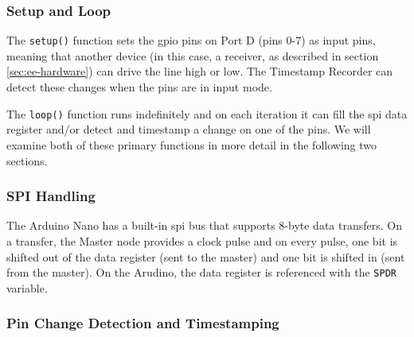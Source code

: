 \documentclass[12pt]{article}
\begin{document}
\subsubsection{Setup and Loop}

The \texttt{setup()} function sets the \gls{gpio} pins on Port D (pins 0-7)
as input pins, meaning that another device (in this case, a receiver, as
described in section \ref{sec:ee-hardware}) can drive the line high or low.
The Timestamp Recorder can detect these changes when the pins are in input
mode.

The \texttt{loop()} function runs indefinitely and on each iteration it can fill
the \gls{spi} data register and/or detect and timestamp a change on one of the
pins.
We will examine both of these primary functions in more detail in the following
two sections.

\subsubsection{SPI Handling}

The Arduino Nano has a built-in \gls{spi} bus that supports 8-byte data
transfers.
On a transfer, the Master node provides a clock pulse and on every pulse, one
bit is shifted out of the data register (sent to the master) and one bit is
shifted in (sent from the master).
On the Arudino, the data register is referenced with the \texttt{SPDR}
variable.

\subsubsection{Pin Change Detection and Timestamping}

\newpage

\printglossary
\end{document}
